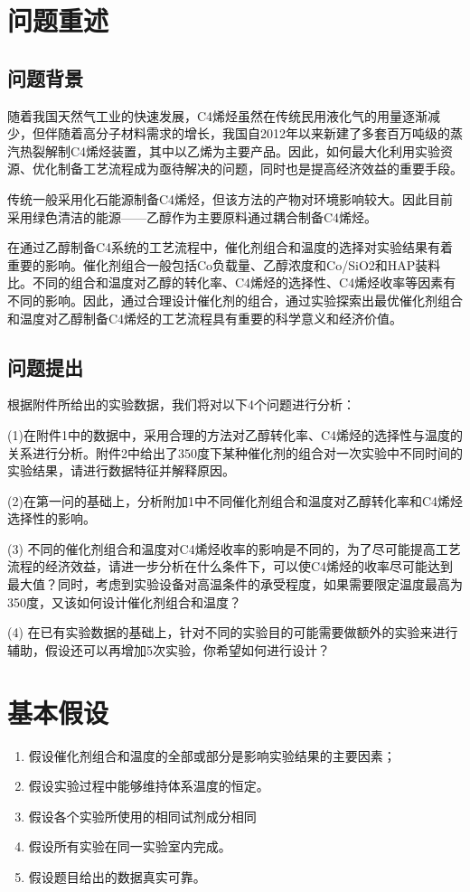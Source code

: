\documentclass[withoutpreface,bwprint]{cumcmthesis} %
\begin{document}
\section{问题重述}
\subsection{问题背景}
随着我国天然气工业的快速发展，C4烯烃虽然在传统民用液化气的用量逐渐减少，但伴随着高分子材料需求的增长，我国自2012年以来新建了多套百万吨级的蒸汽热裂解制C4烯烃装置，其中以乙烯为主要产品。因此，如何最大化利用实验资源、优化制备工艺流程成为亟待解决的问题，同时也是提高经济效益的重要手段。

传统一般采用化石能源制备C4烯烃，但该方法的产物对环境影响较大。因此目前采用绿色清洁的能源——乙醇作为主要原料通过耦合制备C4烯烃。

在通过乙醇制备C4系统的工艺流程中，催化剂组合和温度的选择对实验结果有着重要的影响。催化剂组合一般包括Co负载量、乙醇浓度和Co/SiO2和HAP装料比。不同的组合和温度对乙醇的转化率、C4烯烃的选择性、C4烯烃收率等因素有不同的影响。因此，通过合理设计催化剂的组合，通过实验探索出最优催化剂组合和温度对乙醇制备C4烯烃的工艺流程具有重要的科学意义和经济价值。


\subsection{问题提出}
根据附件所给出的实验数据，我们将对以下4个问题进行分析：

(1)在附件1中的数据中，采用合理的方法对乙醇转化率、C4烯烃的选择性与温度的关系进行分析。附件2中给出了350度下某种催化剂的组合对一次实验中不同时间的实验结果，请进行数据特征并解释原因。

(2)在第一问的基础上，分析附加1中不同催化剂组合和温度对乙醇转化率和C4烯烃选择性的影响。

(3) 不同的催化剂组合和温度对C4烯烃收率的影响是不同的，为了尽可能提高工艺流程的经济效益，请进一步分析在什么条件下，可以使C4烯烃的收率尽可能达到最大值？同时，考虑到实验设备对高温条件的承受程度，如果需要限定温度最高为350度，又该如何设计催化剂组合和温度？

(4) 在已有实验数据的基础上，针对不同的实验目的可能需要做额外的实验来进行辅助，假设还可以再增加5次实验，你希望如何进行设计？


\newpage
\section{基本假设}
\begin{enumerate}
	\item 假设催化剂组合和温度的全部或部分是影响实验结果的主要因素；
	\item 假设实验过程中能够维持体系温度的恒定。
	\item 假设各个实验所使用的相同试剂成分相同
	\item 假设所有实验在同一实验室内完成。
	\item 假设题目给出的数据真实可靠。
\end{enumerate}
\end{document}
